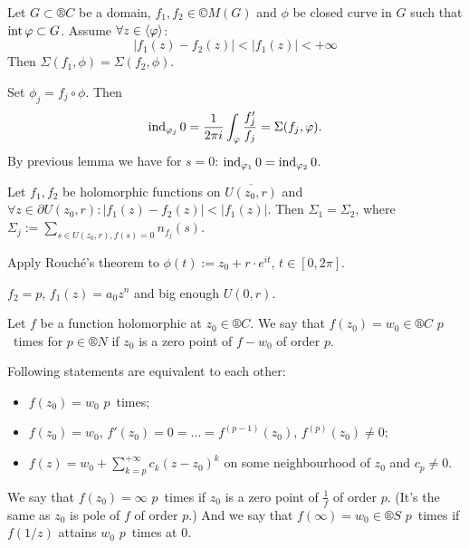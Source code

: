 \documentclass[12pt]{article}					%
\begin{document}
\begin{veta}[Rouché]
	Let $G \subset ®C$ be a domain, $f_1, f_2 \in ©M(G)$ and $\phi$ be closed curve in $G$ such that $\operatorname{int} \varphi \subset G$. Assume $\forall z \in \left\langle\varphi\right\rangle$:
	$$ |f_1(z) - f_2(z)| < |f_1(z)| < +∞ $$
	Then $\Sigma(f_1, \phi) = \Sigma(f_2, \phi)$.

	\begin{dukazin}
		Set $\phi_j = f_j \circ \phi$. Then
		$$ \operatorname{ind}_{\varphi_j} 0 = \frac{1}{2\pi i} \int_\varphi \frac{f_j'}{f_j} = \Sigma(f_j, \varphi). $$
		By previous lemma we have for $s = 0$: $\operatorname{ind}_{\varphi_1} 0 = \operatorname{ind}_{\varphi_2} 0$.
	\end{dukazin}
\end{veta}

\begin{dusledek}
	Let $f_1, f_2$ be holomorphic functions on $\overline{U(z_0, r)}$ and $\forall z \in \partial U(z_0, r): |f_1(z) - f_2(z)| < |f_1(z)|$. Then $\Sigma_1 = \Sigma_2$, where $\Sigma_j := \sum_{s \in U(z_0, r), f(s) = 0} n_{f_j}(s)$.

	\begin{dukazin}
		Apply Rouché's theorem to $\phi(t) := z_0 + r·e^{it}$, $t \in [0, 2\pi]$.
	\end{dukazin}
\end{dusledek}

\begin{priklad}
	$f_2 = p$, $f_1(z) = a_0 z^n$ and big enough $U(0, r)$.
\end{priklad}

\begin{definice}[Notation]
	Let $f$ be a function holomorphic at $z_0 \in ®C$. We say that $f(z_0) = w_0 \in ®C$ $p$~times for $p \in ®N$ if $z_0$ is a zero point of $f - w_0$ of order $p$.

	\begin{poznamkain}
		Following statements are equivalent to each other:

		\begin{itemize}
			\item $f(z_0) = w_0$ $p$~times;
			\item $f(z_0) = w_0$, $f'(z_0) = 0 = … = f^{(p - 1)}(z_0)$, $f^{(p)}(z_0) ≠ 0$;
			\item $f(z) = w_0 + \sum_{k=p}^{+∞} c_k(z - z_0)^k$ on some neighbourhood of $z_0$ and $c_p ≠ 0$.
		\end{itemize}
	\end{poznamkain}

	We say that $f(z_0) = ∞$ $p$~times if $z_0$ is a zero point of $\frac{1}{f}$ of order $p$. (It's the same as $z_0$ is pole of $f$ of order $p$.) And we say that $f(∞) = w_0 \in ®S$ $p$~times if $f(1/z)$ attains $w_0$ $p$~times at 0.
\end{definice}
\end{document}
